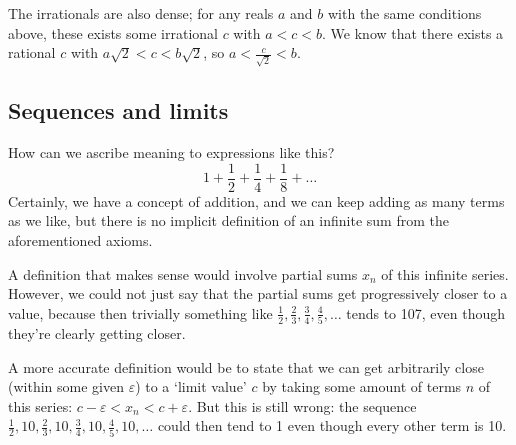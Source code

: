 The irrationals are also dense; for any reals \(a\) and \(b\) with the same conditions above, these exists some irrational \(c\) with \(a<c<b\).
We know that there exists a rational \(c\) with \(a\sqrt{2} < c < b\sqrt{2}\), so \(a < \frac{c}{\sqrt{2}} < b\).

\subsection{Sequences and limits}
How can we ascribe meaning to expressions like this?
\[
	1 + \frac{1}{2} + \frac{1}{4} + \frac{1}{8} + \dots
\]
Certainly, we have a concept of addition, and we can keep adding as many terms as we like, but there is no implicit definition of an infinite sum from the aforementioned axioms.

A definition that makes sense would involve partial sums \(x_n\) of this infinite series.
However, we could not just say that the partial sums get progressively closer to a value, because then trivially something like \(\frac{1}{2}, \frac{2}{3}, \frac{3}{4}, \frac{4}{5}, \dots\) tends to 107, even though they're clearly getting closer.

A more accurate definition would be to state that we can get arbitrarily close (within some given \(\varepsilon\)) to a `limit value' \(c\) by taking some amount of terms \(n\) of this series: \(c - \varepsilon < x_n < c + \varepsilon\).
But this is still wrong: the sequence \(\frac{1}{2}, 10, \frac{2}{3}, 10, \frac{3}{4}, 10, \frac{4}{5}, 10, \dots\) could then tend to 1 even though every other term is 10.


